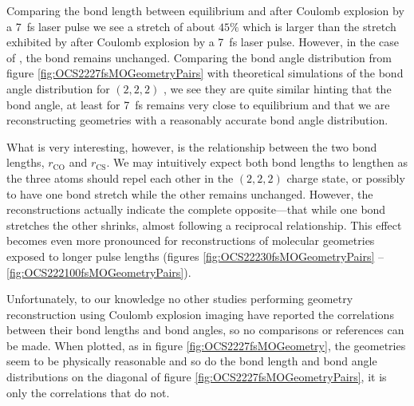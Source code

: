 Comparing the  bond length between equilibrium and after Coulomb explosion by a \SI{7}{\fs} laser pulse we see a stretch of about $45\%$ which is larger than the stretch exhibited by  \cite{Bocharova11} after Coulomb explosion by a \SI{7}{\fs} laser pulse. However, in the case of , the  bond remains unchanged. Comparing the bond angle distribution from figure \ref{fig:OCS2227fsMOGeometryPairs} with theoretical simulations of the bond angle distribution for  $(2,2,2)$ \citep{Wales12HCI}, we see they are quite similar hinting that the bond angle, at least for \SI{7}{\fs} remains very close to equilibrium and that we are reconstructing geometries with a reasonably accurate bond angle distribution.

What is very interesting, however, is the relationship between the two bond lengths, $r_\mathrm{CO}$ and $r_\mathrm{CS}$. We may intuitively expect both bond lengths to lengthen as the three atoms should repel each other in the $(2,2,2)$ charge state, or possibly to have one bond stretch while the other remains unchanged. However, the reconstructions actually indicate the complete opposite---that while one bond stretches the other shrinks, almost following a reciprocal relationship. This effect becomes even more pronounced for reconstructions of molecular geometries exposed to longer pulse lengths (figures \ref{fig:OCS22230fsMOGeometryPairs} -- \ref{fig:OCS222100fsMOGeometryPairs}).


Unfortunately, to our knowledge no other studies performing geometry reconstruction using Coulomb explosion imaging have reported the correlations between their bond lengths and bond angles, so no comparisons or references can be made. When plotted, as in figure \ref{fig:OCS2227fsMOGeometry}, the geometries seem to be physically reasonable and so do the bond length and bond angle distributions on the diagonal of figure \ref{fig:OCS2227fsMOGeometryPairs}, it is only the correlations that do not.


